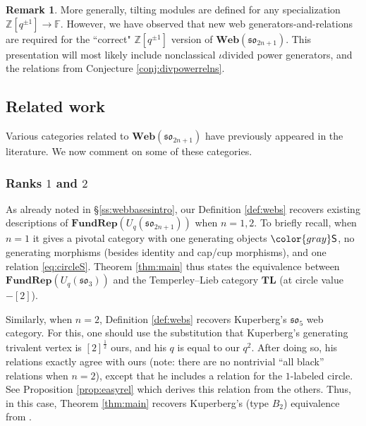 \documentclass[10pt]{amsart}
\newcommand{\gray}[1]{{\color{gray}#1}}
\numberwithin{equation}{section}
\theoremstyle{definition}
\newtheorem{rem}[thm]{Remark}
\newcommand{\son}[1][2n+1]{\mathfrak{so}_{#1}}
\newcommand{\FRep}{\mathbf{FundRep}}
\newcommand{\Web}{\mathbf{Web}}
\newcommand{\gS}{\gray{\mathsf{S}}}
\begin{document}
\begin{rem}
More generally,
tilting modules are defined for any specialization $\mathbb{Z}[q^{\pm 1}]\rightarrow \mathbb{F}$. 
However, we have observed that new web generators-and-relations 
are required for the ``correct" $\mathbb{Z}[q^{\pm 1}]$ version of $\Web(\son)$.
This presentation will most likely include nonclassical $\iota$divided power generators, 
and the relations from Conjecture \ref{conj:divpowerrelns}.
\end{rem}

\subsection{Related work}

Various categories related to $\Web(\son)$ have previously appeared in the literature. 
We now comment on some of these categories.

\subsubsection{Ranks $1$ and $2$}

As already noted in \S \ref{ss:webbasesintro}, 
our Definition \ref{def:webs} recovers existing descriptions of $\FRep(U_q(\son))$ when $n=1,2$.
To briefly recall, 
when $n=1$ it gives a pivotal category with one generating objects $\gS$, 
no generating morphisms (besides identity and cap/cup morphisms), 
and one relation \eqref{eq:circleS}. 
Theorem \ref{thm:main} thus states the equivalence between 
$\FRep(U_q(\son[3]))$ and the Temperley--Lieb category $\mathbf{TL}$ (at circle value $-[2]$).

Similarly, when $n=2$, Definition \ref{def:webs} recovers Kuperberg's $\son[5]$ web category. 
For this, one should use the substitution that Kuperberg's generating trivalent vertex is 
$[2]^{\frac{1}{2}}$ ours, and his $q$ is equal to our $q^2$. 
After doing so, his relations exactly agree with ours 
(note: there are no nontrivial ``all black'' relations when $n=2$), 
except that he includes a relation for the $1$-labeled circle. 
See Proposition \ref{prop:easyrel} which derives this relation from the others.
Thus, in this case, Theorem \ref{thm:main} recovers Kuperberg's (type $B_2$) 
equivalence from \cite{Kup}.
\end{document}

